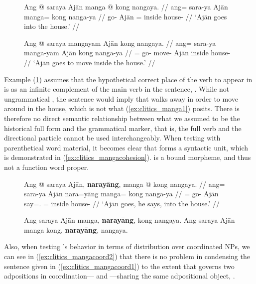 \begin{figure}
\pex\label{ex:clitics_manga}
\a\label{ex:clitics_manga1}\begingl
	\gla Ang @ saraya Ajān manga @ kong nangaya. //
	\glb ang= sara-ya Ajān manga= kong nanga-ya //
	\glc \AgtT{} go-\TsgM{} Ajān \Dir{}= inside house-\Loc{} //
	\glft `Ajān goes into the house.' //
\endgl

\a\label{ex:clitics_manga2}\ljudge{\excl}\begingl
\gla Ang @ saraya mangayam Ajān kong nangaya. //
	\glb ang= sara-ya manga-yam Ajān kong nanga-ya //
	\glc \AgtT{}= go-\TsgM{} move-\Ptcp{} Ajān inside house-\Loc{} //
	\glft `Ajān goes to move inside the house.' //
\endgl
\xe
\end{figure}

Example (\ref{ex:clitics_manga2}) assumes that the hypothetical correct place
of the verb  to appear in is as an infinite complement
of the main verb in the sentence, . While not
ungrammatical , the sentence would imply that 
walks away in order to move around in the house, which is not what
(\ref{ex:clitics_manga1}) posits. There is therefore no direct semantic relationship
between what we assumed to be the historical full form and the grammatical
marker, that is, the full verb and the directional particle cannot be used
interchangeably. When testing with parenthetical word material, it becomes
clear that  forms a syntactic unit, which is
demonstrated in (\ref{ex:clitics_mangacohesion}).  is a bound
morpheme, and thus not a function word proper.

\begin{figure}
\pex\label{ex:clitics_mangacohesion}
\a\label{ex:clitics_mangacohesion1}\begingl
	\gla Ang @ saraya Ajān, \textbf{narayāng}, manga @ kong nangaya. //
	\glb ang= sara-ya Ajān nara=yāng manga= kong nanga-ya //
	\glc \AgtT{}= go-\TsgM{} Ajān say=\TsgM{}.\Aarg{} \Dir{}= inside 
		house-\Loc{} //
	\glft `Ajān goes, he says, into the house.' //
\endgl

\a\label{ex:clitics_mangacohesion2}
	\ljudge{*} Ang saraya Ajān manga, \textbf{narayāng}, kong nangaya.
\a\label{ex:clitics_mangacohesion3}
	Ang saraya Ajān manga kong, \textbf{narayāng}, nangaya.
\xe
\end{figure}

Also, when testing 's behavior in terms of distribution over
coordinated NPs, we can see in (\ref{ex:clitics_mangacoord2}) that there is no
problem in condensing the sentence given in (\ref{ex:clitics_mangacoord1}) to
the extent that  governs two adpositions in
coordination--- and
---sharing the same adpositional object,
.

